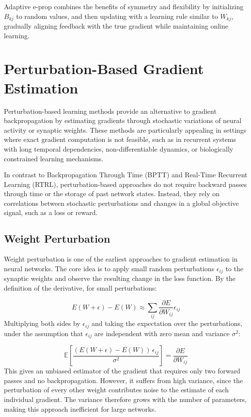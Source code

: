 Adaptive e-prop combines the benefits of symmetry and flexibility by initializing $B_{kj}$ to random values, and then updating with a learning rule similar to $W_{kj}$, gradually aligning feedback with the true gradient while maintaining online learning.

\section{Perturbation-Based Gradient Estimation}
\label{sec:perturbation}

Perturbation-based learning methods provide an alternative to gradient
backpropagation by estimating gradients through stochastic variations of
neural activity or synaptic weights. These methods are particularly appealing
in settings where exact gradient computation is not feasible, such as in
recurrent systems with long temporal dependencies, non-differentiable
dynamics, or biologically constrained learning mechanisms.

In contrast to Backpropagation Through Time (BPTT) and Real-Time Recurrent
Learning (RTRL), perturbation-based approaches do not require backward passes
through time or the storage of past network states. Instead, they rely on
correlations between stochastic perturbations and changes in a global
objective signal, such as a loss or reward.

\subsection{Weight Perturbation}

Weight perturbation is one of the earliest approaches to gradient estimation
in neural networks. The core idea is to apply small random perturbations
$\epsilon_{ij}$ to the synaptic weights and observe the resulting change in
the loss function. By the definition of the derivative, for small
perturbations:

\begin{equation}
E(W + \epsilon) - E(W) \approx \sum_{ij} \frac{\partial E}{\partial W_{ij}} \epsilon_{ij}
\end{equation}
Multiplying both sides by $\epsilon_{ij}$ and taking the expectation over
the perturbations, under the assumption that $\epsilon_{ij}$ are independent
with zero mean and variance $\sigma^2$:

\begin{equation}
\mathbb{E}\left[ \frac{(E(W+\epsilon) - E(W)) \, \epsilon_{ij}}{\sigma^2} \right] = \frac{\partial E}{\partial W_{ij}}
\end{equation}
This gives an unbiased estimator of the gradient that requires only two
forward passes and no backpropagation. However, it suffers from high
variance, since the perturbation of every other weight contributes noise to
the estimate of each individual gradient. The variance therefore grows with
the number of parameters, making this approach inefficient for large
networks.
